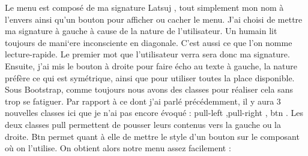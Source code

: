 \documentclass{article}
\begin{document}
Le menu est compos\'e de ma signature \og Latsuj \fg{}, tout simplement mon nom \`a l'envers ainsi qu'un bouton pour afficher ou cacher le menu. J'ai choisi de mettre ma signature \`a gauche \`a cause de la nature de l'utilisateur. Un humain lit toujours de mani`ere inconsciente en diagonale. C'est aussi ce que l'on nomme lecture-rapide. Le premier mot que l'utilisateur verra sera donc ma signature. Ensuite, j'ai mis le bouton \`a droite pour faire \'echo au texte \`a gauche, la nature pr\'ef\`ere ce qui est sym\'etrique, ainsi que pour utiliser toutes la place disponible. Sous Bootstrap, comme toujours nous avons des classes pour r\'ealiser cela sans trop se fatiguer. Par rapport \`a ce dont j'ai parl\'e pr\'ec\'edemment, il y aura 3 nouvelles classes ici que je n'ai pas encore \'evoqu\'e : \og pull-left \fg{},\og pull-right \fg{}, \og btn \fg{}. Les deux classes \og pull \fg{} permettent de pousser leurs contenus vers la gauche ou la droite. \og Btn \fg{} permet quant \`a elle de mettre le style d'un bouton sur le composant o\`u on l'utilise. On obtient alors notre menu assez facilement :
\vspace{0.5cm}\\
\end{document}
